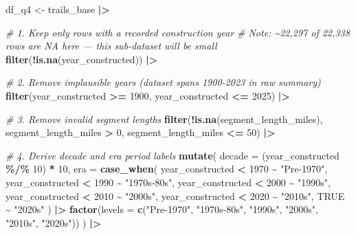 \documentclass[
]{article}
\newenvironment{Shaded}{\begin{snugshade}}{\end{snugshade}}
\newcommand{\AttributeTok}[1]{\textcolor[rgb]{0.13,0.29,0.53}{#1}}
\newcommand{\CommentTok}[1]{\textcolor[rgb]{0.56,0.35,0.01}{\textit{#1}}}
\newcommand{\ConstantTok}[1]{\textcolor[rgb]{0.56,0.35,0.01}{#1}}
\newcommand{\DecValTok}[1]{\textcolor[rgb]{0.00,0.00,0.81}{#1}}
\newcommand{\FunctionTok}[1]{\textcolor[rgb]{0.13,0.29,0.53}{\textbf{#1}}}
\newcommand{\NormalTok}[1]{#1}
\newcommand{\OtherTok}[1]{\textcolor[rgb]{0.56,0.35,0.01}{#1}}
\newcommand{\SpecialCharTok}[1]{\textcolor[rgb]{0.81,0.36,0.00}{\textbf{#1}}}
\newcommand{\StringTok}[1]{\textcolor[rgb]{0.31,0.60,0.02}{#1}}
\begin{document}
\begin{Shaded}
\begin{Highlighting}[]
\NormalTok{df\_q4 }\OtherTok{\textless{}{-}}\NormalTok{ trails\_base }\SpecialCharTok{|\textgreater{}}
  
  \CommentTok{\# 1. Keep only rows with a recorded construction year}
  \CommentTok{\#    Note: \textasciitilde{}22,297 of 22,338 rows are NA here — this sub{-}dataset will be small}
  \FunctionTok{filter}\NormalTok{(}\SpecialCharTok{!}\FunctionTok{is.na}\NormalTok{(year\_constructed)) }\SpecialCharTok{|\textgreater{}}
  
  \CommentTok{\# 2. Remove implausible years (dataset spans 1900{-}2023 in raw summary)}
  \FunctionTok{filter}\NormalTok{(year\_constructed }\SpecialCharTok{\textgreater{}=} \DecValTok{1900}\NormalTok{, year\_constructed }\SpecialCharTok{\textless{}=} \DecValTok{2025}\NormalTok{) }\SpecialCharTok{|\textgreater{}}
  
  \CommentTok{\# 3. Remove invalid segment lengths}
  \FunctionTok{filter}\NormalTok{(}\SpecialCharTok{!}\FunctionTok{is.na}\NormalTok{(segment\_length\_miles),}
\NormalTok{         segment\_length\_miles }\SpecialCharTok{\textgreater{}} \DecValTok{0}\NormalTok{,}
\NormalTok{         segment\_length\_miles }\SpecialCharTok{\textless{}=} \DecValTok{50}\NormalTok{) }\SpecialCharTok{|\textgreater{}}
  
  \CommentTok{\# 4. Derive decade and era period labels}
  \FunctionTok{mutate}\NormalTok{(}
    \AttributeTok{decade =}\NormalTok{ (year\_constructed }\SpecialCharTok{\%/\%} \DecValTok{10}\NormalTok{) }\SpecialCharTok{*} \DecValTok{10}\NormalTok{,}
    \AttributeTok{era    =} \FunctionTok{case\_when}\NormalTok{(}
\NormalTok{      year\_constructed }\SpecialCharTok{\textless{}} \DecValTok{1970} \SpecialCharTok{\textasciitilde{}} \StringTok{"Pre{-}1970"}\NormalTok{,}
\NormalTok{      year\_constructed }\SpecialCharTok{\textless{}} \DecValTok{1990} \SpecialCharTok{\textasciitilde{}} \StringTok{"1970s{-}80s"}\NormalTok{,}
\NormalTok{      year\_constructed }\SpecialCharTok{\textless{}} \DecValTok{2000} \SpecialCharTok{\textasciitilde{}} \StringTok{"1990s"}\NormalTok{,}
\NormalTok{      year\_constructed }\SpecialCharTok{\textless{}} \DecValTok{2010} \SpecialCharTok{\textasciitilde{}} \StringTok{"2000s"}\NormalTok{,}
\NormalTok{      year\_constructed }\SpecialCharTok{\textless{}} \DecValTok{2020} \SpecialCharTok{\textasciitilde{}} \StringTok{"2010s"}\NormalTok{,}
      \ConstantTok{TRUE}                    \SpecialCharTok{\textasciitilde{}} \StringTok{"2020s"}
\NormalTok{    ) }\SpecialCharTok{|\textgreater{}} \FunctionTok{factor}\NormalTok{(}\AttributeTok{levels =} \FunctionTok{c}\NormalTok{(}\StringTok{"Pre{-}1970"}\NormalTok{, }\StringTok{"1970s{-}80s"}\NormalTok{, }\StringTok{"1990s"}\NormalTok{,}
                           \StringTok{"2000s"}\NormalTok{, }\StringTok{"2010s"}\NormalTok{, }\StringTok{"2020s"}\NormalTok{))}
\NormalTok{  ) }\SpecialCharTok{|\textgreater{}}
  

\end{Highlighting}
\end{Shaded}
\end{document}
